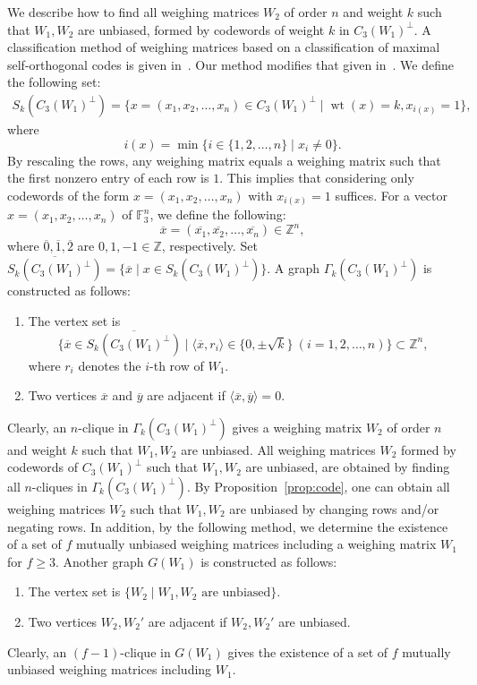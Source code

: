 \documentclass[12pt]{article}
\theoremstyle{remark}
\newcommand{\FF}{\mathbb{F}}
\newcommand{\ZZ}{\mathbb{Z}}
\DeclareMathOperator{\wt}{wt}
\begin{document}
We describe how to find all weighing matrices  $W_2$ of order $n$ and weight $k$ 
such that $W_1,W_2$ are unbiased,
formed by codewords of weight $k$ in $C_3(W_1)^\perp$.
A classification method of weighing matrices based on a classification
of maximal self-orthogonal codes is given in~\cite{HM}.
Our method modifies that given in~\cite{HM}.
We define the following set:
\begin{multline*}
S_{k}(C_3(W_1)^\perp) 
=\{x=(x_1,x_2,\ldots,x_n) \in C_3(W_1)^\perp \mid \wt(x)=k, x_{i(x)}=1 \},
\end{multline*}
where
\[
i(x)=\min\{i \in \{1,2,\ldots,n\} \mid x_i \ne 0\}.
\]
By rescaling the rows, any weighing matrix equals a weighing matrix 
such that the first nonzero entry of each row is $1$.
This implies that considering only codewords of the form $x=(x_1,x_2,\dots,x_{n})$ 
with $x_{i(x)}=1$ suffices.
For a vector $x=(x_1,x_2,\ldots,x_{n})$ of $\FF_3^{n}$, we define the following:
\[
\overline{x}=(\overline{x_1},\overline{x_2},\ldots,\overline{x_{n}}) \in \ZZ^{n},
\]
where 
$\overline{0},\overline{1},\overline{2}$ are $0, 1,-1 \in \ZZ$, respectively.
Set $\overline{S_{k}(C_3(W_1)^\perp)}=\{
\overline{x} \mid x \in S_{k}(C_3(W_1)^\perp)\}$. 
A graph $\Gamma_{k}(C_3(W_1)^\perp)$ is constructed as follows:
\begin{enumerate}
\item The vertex set is 
\[
\{\overline{x}  \in \overline{S_{k}(C_3(W_1)^\perp)} \mid  
\langle \overline{x},r_i \rangle \in 
\{0,\pm \sqrt{k}\} \ (i=1,2,\ldots,n)\} \subset \ZZ^{n},
\]
where $r_i$ denotes the $i$-th row of $W_1$.
\item Two vertices $\overline{x}$ and $\overline{y}$ are adjacent
if $\langle \overline{x},\overline{y}\rangle =0$.
\end{enumerate}
Clearly, an $n$-clique in $\Gamma_{k}(C_3(W_1)^\perp)$ gives a weighing matrix 
$W_2$ of order $n$
and weight $k$ such that $W_1,W_2$ are unbiased.
All weighing matrices $W_2$
formed by codewords of $C_3(W_1)^\perp$ such that $W_1,W_2$ are unbiased,
are obtained
by finding all $n$-cliques in $\Gamma_{k}(C_3(W_1)^\perp)$.
By Proposition~\ref{prop:code}, 
one can obtain all weighing matrices $W_2$ such that $W_1,W_2$ are unbiased
by changing rows and/or negating rows.
In addition, by the following method,
we determine the existence of a set of $f$ mutually unbiased weighing matrices 
including a weighing matrix $W_1$ for $f \ge 3$.
Another graph $G(W_1)$ is constructed as follows:
\begin{enumerate}
\item The vertex set is 
$\{W_2 \mid W_1,W_2 \text{ are unbiased}\}$.
\item 
Two vertices $W_2,W_2'$ are adjacent if $W_2,W_2'$ are unbiased.
\end{enumerate}
Clearly, an $(f-1)$-clique in $G(W_1)$ gives the existence of 
a set of $f$ mutually unbiased weighing matrices including $W_1$.
\end{document}

